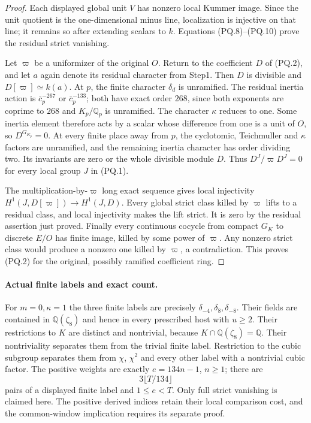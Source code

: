 \begin{proof}
Each displayed global unit $V$ has nonzero local Kummer image.
Since the unit quotient is the one-dimensional minus line,
localization is injective on that line; it remains so after
extending scalars to $k$.
Equations (PQ.8)--(PQ.10) prove the residual strict vanishing.

Let $\varpi$ be a uniformizer of the original $O$.
Return to the coefficient $D$ of (PQ.2), and let $a$ again denote
its residual character from Step1.  Then $D$ is divisible and
$D[\varpi]\simeq k(a)$.
At $p$, the finite character $\delta_d$ is unramified.
The residual inertia action is $\bar c_p^{-267}$ or
$\bar c_p^{-133}$; both have exact order $268$, since both
exponents are coprime to $268$ and $K_p/\mathbb Q_p$ is unramified.
The character $\kappa$ reduces to one.
Some inertia element therefore acts by a scalar whose difference
from one is a unit of $O$, so $D^{G_{K_p}}=0$.
At every finite place away from $p$, the cyclotomic, Teichmuller
and $\kappa$ factors are unramified, and the remaining inertia
character has order dividing two.
Its invariants are zero or the whole divisible module $D$.
Thus $D^J/\varpi D^J=0$ for every local group $J$ in (PQ.1).

The multiplication-by-$\varpi$ long exact sequence gives local
injectivity $H^1(J,D[\varpi])\to H^1(J,D)$.
Every global strict class killed by $\varpi$ lifts to a residual
class, and local injectivity makes the lift strict.
It is zero by the residual assertion just proved.
Finally every continuous cocycle from compact $G_K$ to discrete
$E/O$ has finite image, killed by some power of $\varpi$.
Any nonzero strict class would produce a nonzero one killed by
$\varpi$, a contradiction.  This proves (PQ.2) for the original,
possibly ramified coefficient ring.
\end{proof}

\paragraph{Actual finite labels and exact count.}
For $m=0,\kappa=1$ the three finite labels are precisely
$\delta_{-4},\delta_8,\delta_{-8}$.
Their fields are contained in $\mathbb Q(\zeta_8)$ and hence
in every prescribed host with $u\geq2$.
Their restrictions to $K$ are distinct and nontrivial, because
$K\cap\mathbb Q(\zeta_8)=\mathbb Q$.
Their nontriviality separates them from the trivial finite label.
Restriction to the cubic subgroup separates them from $\chi$,
$\chi^2$ and every other label with a nontrivial cubic factor.
The positive weights are exactly $e=134n-1$, $n\geq1$;
there are
\[
                             3\lfloor T/134\rfloor
 \tag{PQ.16}
\]
pairs of a displayed finite label and $1\leq e<T$.
Only full strict vanishing is claimed here.
The positive derived indices retain their local comparison cost,
and the common-window implication requires its separate proof.


